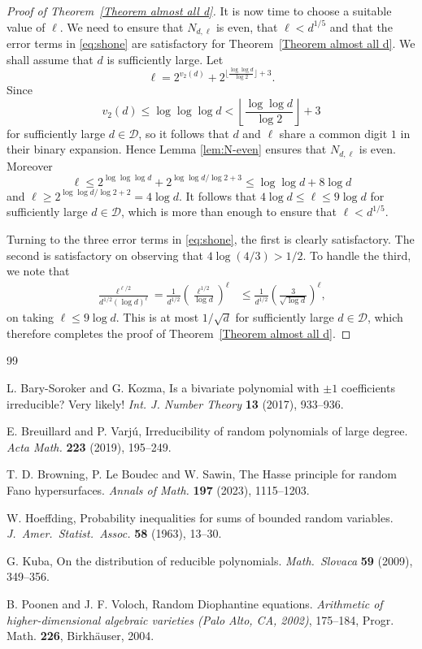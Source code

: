\documentclass[11pt, reqno]{amsart}
\numberwithin{equation}{section}
\renewcommand{\leq}{\leqslant}
\renewcommand{\geq}{\geqslant}
\begin{document}
\begin{proof}[Proof of Theorem~\ref{Theorem almost all d}]
It is now time to choose a suitable value of $\ell$. 
We need to ensure that $N_{d,\ell}$ is even, that $\ell<d^{1/5}$ and that the error terms in \eqref{eq:shone} are satisfactory for 
Theorem~\ref{Theorem almost all d}.
We shall assume that $d$ is sufficiently large. 
Let 
\begin{equation*}
\ell = 2^{v_2(d)} + 
2^{\lfloor \frac{\log\log d}{\log 2} \rfloor+3}.
\end{equation*}
Since 
$$
v_2(d)\leq \log\log\log d<
\left\lfloor \frac{\log\log d}{\log 2} \right\rfloor+3
$$ 
for sufficiently large $d\in \mathcal{D}$, 
so it follows that 
$d$ and $\ell$ share a common digit $1$  in their binary expansion. Hence 
Lemma \ref{lem:N-even} ensures that 
$N_{d,\ell}$ is even. Moreover 
$$
\ell \leq 2^{\log\log\log d} + 2^{\log\log d/\log 2+3} \leq \log\log d + 8\log d
$$
and $\ell\geq 2^{\log\log d/\log2+2}=4\log d$.
It follows that $4\log d\leq \ell \leq 9\log d$ for 
sufficiently large $d\in \mathcal{D}$, which is more than enough to ensure that
 $\ell<d^{1/5}$.

Turning to the three error terms in 
\eqref{eq:shone}, the first is   clearly satisfactory. The second is satisfactory on observing that 
$4\log(4/3)> 1/2$.
To handle the third, we note that 
\begin{align*}
\frac{\ell^{\ell/2}}{d^{1/2}(\log d)^\ell} =
\frac{1}{d^{1/2}} \left(\frac{\ell^{1/2}}{\log d}\right)^\ell
&\leq 
\frac{1}{d^{1/2}} \left(\frac{3}{\sqrt{\log d}}\right)^\ell,
\end{align*}
on taking $\ell \leq 9\log d$. This is at most $1/\sqrt{d}$ for 
sufficiently large $d\in \mathcal{D}$, 
which therefore  completes the proof of Theorem~\ref{Theorem almost all d}.
\end{proof}


\begin{thebibliography}{99} 


L. Bary-Soroker and G. Kozma,
Is a bivariate polynomial with $\pm 1$ coefficients irreducible? Very likely!
{\em Int. J.  Number Theory}  {\bf 13} (2017), 933--936.

E. Breuillard and P. Varj\'u,
Irreducibility of random polynomials of large degree.
{\em Acta Math.} {\bf 223} (2019), 195--249.

T. D. Browning, P. Le Boudec and W. Sawin,
The Hasse principle for random Fano hypersurfaces.
{\em Annals of Math.} {\bf 197} (2023), 1115--1203.

W. Hoeffding,  Probability inequalities for sums of bounded random variables. {\em 
J.\  Amer.\ Statist.\ Assoc.} {\bf 58} 
(1963), 13--30.


G. Kuba, On the distribution of reducible polynomials. {\em Math.\ Slovaca} {\bf 59}  (2009), 349--356.

B. Poonen and J. F. Voloch, Random Diophantine equations. 
{\em Arithmetic of higher-dimensional algebraic varieties (Palo Alto,
CA, 2002)}, 175--184,
Progr. Math. {\bf 226}, Birkh\"auser, 2004.


\end{thebibliography}
\end{document}
